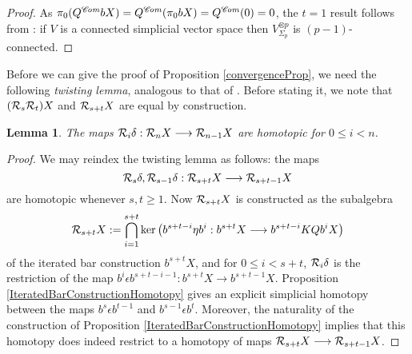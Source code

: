 \documentclass[11pt]{amsart} \renewcommand{\baselinestretch}{1.2}
\theoremstyle{plain}
\newtheorem{lem}[thm]{Lemma}
\numberwithin{equation}{section} %
\theoremstyle{plain}
\newtheorem{lem}[thm]{Lemma}
\numberwithin{equation}{chapter} %
\renewcommand{\ker}{\mathrm{ker}\,}
\renewcommand{\to}{\longrightarrow}
\newcommand{\scrC}{\mathscr{C}}
\newcommand{\calR}{\mathcal{R}}
\newcommand{\algs}{{\scrC\!\textit{\normalfont\textit{om}}}}
\newcommand{\caldup}[1]{\calR_{\smash{#1}}}
\newcommand{\barConstructionMightAbbreviate}{b}
\begin{document}
\begin{Bousfield-Kan spectral sequence}
\begin{proof}
%
As $\pi_0(Q^{\algs}\barConstructionMightAbbreviate X)=Q^{\algs}(\pi_0\barConstructionMightAbbreviate X)=Q^{\algs}(0)=0$, %
the $t=1$ result follows from \cite[Satz 12.1]{DoldPuppeSuspension.pdf}: if $V$ is a connected simplicial vector space then $V^{\otimes p}_{\Sigma_p}$ is $(p-1)$-connected. 
\end{proof}
Before we can give the proof of Proposition \ref{convergenceProp}, we need the following \emph{twisting lemma}, analogous to that of \cite{BK_pairings.pdf}. Before stating it, we note that $(\caldup{s}\caldup{t})X$ and $\caldup{s+t}X$ are equal by construction.
\begin{lem}
\label{DsDt=Dt+s}
The maps $\caldup{i}\delta:\caldup{n}X\to \caldup{n-1}X$ are homotopic for $0\leq i< n$.
\end{lem}
\begin{proof}
We may reindex the twisting lemma as follows: the maps 
\[\caldup{s}\delta,\caldup{s-1}\delta:\caldup{s+t}X\to \caldup{s+t-1}X\]
are homotopic whenever $s,t\geq1$. Now $\caldup{s+t}X$ is constructed as the subalgebra
\[\caldup{s+t}X:= \bigcap_{i=1}^{s+t}\ker\!\left(\barConstructionMightAbbreviate^{s+t-i}\eta \barConstructionMightAbbreviate^{i}:\barConstructionMightAbbreviate^{s+t}X\to \barConstructionMightAbbreviate^{s+t-i}KQ\barConstructionMightAbbreviate^{i}X\right)\]
of the iterated bar construction $\barConstructionMightAbbreviate^{s+t}X$, and for $0\leq i<s+t$, $\caldup{i}\delta$ is the restriction of the map $\barConstructionMightAbbreviate^i\epsilon \barConstructionMightAbbreviate^{s+t-i-1}:\barConstructionMightAbbreviate^{s+t}X\to \barConstructionMightAbbreviate^{s+t-1}X$.
Proposition \ref{IteratedBarConstructionHomotopy} gives an explicit simplicial homotopy between the maps $\barConstructionMightAbbreviate^s\epsilon \barConstructionMightAbbreviate^{t-1}$ and $\barConstructionMightAbbreviate^{s-1}\epsilon \barConstructionMightAbbreviate^{t}$. Moreover, the naturality of the construction of Proposition \ref{IteratedBarConstructionHomotopy} implies that this homotopy does indeed restrict to a homotopy of maps $\caldup{s+t}X\to \caldup{s+t-1}X$.
\end{proof}



\end{Bousfield-Kan spectral sequence}
\end{document}

